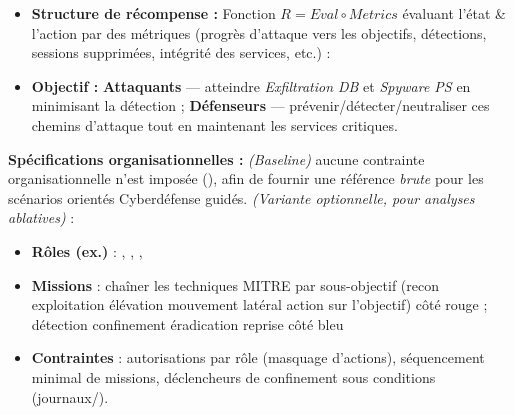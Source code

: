 \begin{itemize}
\begin{enumerate*}[label={\alph*)}, itemjoin={; \ }]
        \end{enumerate*}
  \item \textbf{Structure de récompense :} Fonction $R = Eval \circ Metrics$ évaluant l'état \& l'action par des métriques (progrès d'attaque vers les objectifs, détections, sessions supprimées, intégrité des services, etc.) :
  \item \textbf{Objectif :} \textbf{Attaquants} — atteindre \emph{Exfiltration DB} et \emph{Spyware PS} en minimisant la détection ; \textbf{Défenseurs} — prévenir/détecter/neutraliser ces chemins d'attaque tout en maintenant les services critiques.
\end{itemize}

\medskip
\textbf{Spécifications organisationnelles :} \emph{(Baseline)} aucune contrainte organisationnelle n'est imposée (), afin de fournir une référence \emph{brute} pour les scénarios orientés Cyberdéfense guidés. \emph{(Variante optionnelle, pour analyses ablatives)} :
\begin{itemize}
  \item \textbf{Rôles (ex.)} : , , , 
  \item \textbf{Missions} : chaîner les techniques MITRE par sous-objectif (recon \textrightarrow{} exploitation \textrightarrow{} élévation \textrightarrow{} mouvement latéral \textrightarrow{} action sur l'objectif) côté rouge ; détection \textrightarrow{} confinement \textrightarrow{} éradication \textrightarrow{} reprise côté bleu
  \item \textbf{Contraintes} : autorisations par rôle (masquage d'actions), séquencement minimal de missions, déclencheurs de confinement sous conditions (journaux/).
\end{itemize}

